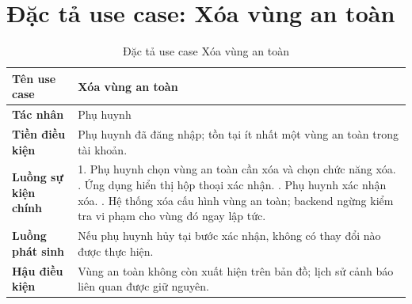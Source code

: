 \documentclass[../DoAn.tex]{subfiles}
\begin{document}
\section{Đặc tả use case: Xóa vùng an toàn}

\begin{table}[H]
\centering
\caption{Đặc tả use case Xóa vùng an toàn}
\label{table:uc_delete_geofence}
\begin{tabular}{|l|p{9.5cm}|}
\hline
\textbf{Tên use case}       & Xóa vùng an toàn \\
\hline
\textbf{Tác nhân}           & Phụ huynh \\
\hline
\textbf{Tiền điều kiện}     & Phụ huynh đã đăng nhập; tồn tại ít nhất một vùng an toàn trong tài khoản. \\
\hline
\textbf{Luồng sự kiện chính} &
1. Phụ huynh chọn vùng an toàn cần xóa và chọn chức năng xóa. \newline
2. Ứng dụng hiển thị hộp thoại xác nhận. \newline
3. Phụ huynh xác nhận xóa. \newline
4. Hệ thống xóa cấu hình vùng an toàn; backend ngừng kiểm tra vi phạm cho vùng đó ngay lập tức. \\
\hline
\textbf{Luồng phát sinh}    & Nếu phụ huynh hủy tại bước xác nhận, không có thay đổi nào được thực hiện. \\
\hline
\textbf{Hậu điều kiện}      & Vùng an toàn không còn xuất hiện trên bản đồ; lịch sử cảnh báo liên quan được giữ nguyên. \\
\hline
\end{tabular}
\end{table}
\end{document}
